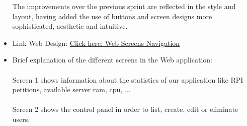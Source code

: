\documentclass[11pt,a4paper]{article}
\begin{document}
\begin{itemize}
The improvements over the previous sprint are reflected in the style and layout, having added the use of buttons and screen designs more sophisticated, aesthetic and intuitive. 

\item Link Web Design:\newline\newline
 \textcolor{blue}{\href{https://drive.google.com/open?id=1O2AmtC1dJX7Pf473Isi73ArwLkCy9E7a}{Click here: Web Screens Navigation}}
 \item Brief explanation of the different screens in the Web application: 
\\ \\
Screen 1 shows information about the statistics of our application like RPI petitions, available server ram, cpu, ...
\\ \\
Screen 2 shows the control panel in order to list, create, edit or eliminate users.


\end{itemize}
\end{document}
